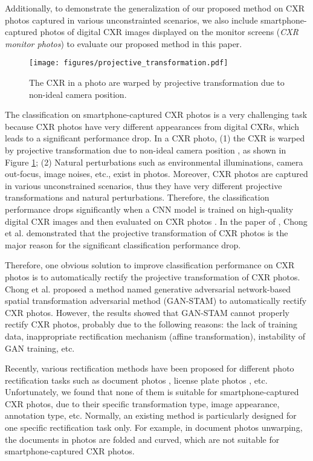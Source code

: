 \documentclass[preprint, 12pt]{elsarticle}
\begin{document}
Additionally, to demonstrate the generalization of our proposed method on CXR photos captured in various unconstrainted scenarios, we also include smartphone-captured photos of digital CXR images displayed on the monitor screens (\textit{CXR monitor photos}) to evaluate our proposed method in this paper.

\begin{figure}
    \centering
    \texttt{[image: figures/projective\_transformation.pdf]}
    \caption{The CXR in a photo are warped by projective transformation due to non-ideal camera position.}
    \label{fig:projective_transformation}
\end{figure}

The classification on smartphone-captured CXR photos is a very challenging task because CXR photos have very different appearances from digital CXRs, which leads to a significant performance drop. In a CXR photo, (1) the CXR is warped by projective transformation due to non-ideal camera position \cite{liang2005camera}, as shown in Figure \ref{fig:projective_transformation}; (2) Natural perturbations such as environmental illuminations, camera out-focus, image noises, etc., exist in photos. Moreover, CXR photos are captured in various unconstrained scenarios, thus they have very different projective transformations and natural perturbations. Therefore, the classification performance drops significantly when a CNN model is trained on high-quality digital CXR images and then evaluated on CXR photos \cite{kuo2021recalibration,chong2021gan,rajpurkar2021chexternal}. In the paper of \cite{chong2021gan}, Chong et al. demonstrated that the projective transformation of CXR photos is the major reason for the significant classification performance drop.

Therefore, one obvious solution to improve classification performance on CXR photos is to automatically rectify the projective transformation of CXR photos. Chong et al. \cite{chong2021gan} proposed a method named generative adversarial network-based spatial transformation adversarial method (GAN-STAM)  to automatically rectify CXR photos. However, the results showed that GAN-STAM cannot properly rectify CXR photos, probably due to the following reasons: the lack of training data, inappropriate rectification mechanism (affine transformation), instability of GAN training, etc.

Recently, various rectification methods have been proposed for different photo rectification tasks such as document photos \cite{xue2022fourier,jiang2022revisiting,bandyopadhyay2022rectinet,ma2018docunet,das2019dewarpnet,feng2021docscanner,quan2022recovering}, license plate photos \cite{silva2021flexible,bjorklund2019robust,silva2018license, xu20212d, xu2021eilpr}, etc. Unfortunately, we found that none of them is suitable for smartphone-captured CXR photos, due to their specific transformation type, image appearance, annotation type, etc. Normally, an existing method is particularly designed for one specific rectification task only. For example, in document photos unwarping, the documents in photos are folded and curved, which are not suitable for smartphone-captured CXR photos.
\end{document}
